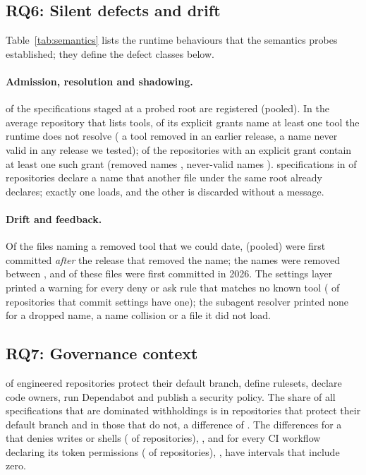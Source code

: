 \subsection{RQ6: Silent defects and drift}
\label{sec:res-rq6}

Table~\ref{tab:semantics} lists the runtime behaviours that the semantics probes established; they define the defect
classes below.



\paragraph{Admission, resolution and shadowing.}
\RQsixRegistered{} of the specifications staged at a probed root are registered (pooled). In the average repository
that lists tools, \RQsixUnresolved{} of its explicit grants name at least one tool the runtime does not resolve
(\RQsixLegacy{} a tool removed in an earlier release, \RQsixNeverValid{} a name never valid in any release we tested);
\RQsixUnresolvedRepos{} of the \nReposExplicit{} repositories with an explicit grant contain at least one such grant
(removed names \RQsixLegacyRepos{}, never-valid names \RQsixNeverValidRepos{}). \RQsixShadowed{} specifications in
\RQsixShadowedRepos{} of repositories declare a name that another file under the same root already declares; exactly
one loads, and the other is discarded without a message.

\paragraph{Drift and feedback.}
Of the \nDriftDated{} files naming a removed tool that we could date, \RQsixDriftAfter{} (pooled) were first committed
\emph{after} the release that removed the name; the names were removed between \DriftRemovalWindow{}, and
\RQsixDriftInSnapshotYear{} of these files were first committed in 2026. The settings layer printed a warning for every
deny or ask rule that matches no known tool (\RQsixVoidSettings{} of repositories that commit settings have one); the
subagent resolver printed none for a dropped name, a name collision or a file it did not load.

\subsection{RQ7: Governance context}
\label{sec:res-rq7}

\RQsevenBranchProtected{} of engineered repositories protect their default branch, \RQsevenRulesets{} define rulesets,
\RQsevenCodeowners{} declare code owners, \RQsevenDependabot{} run Dependabot and \RQsevenSecurityPolicy{} publish a
security policy. The share of all specifications that are dominated withholdings is \RQsevenIncoherentGoverned{} in
repositories that protect their default branch and \RQsevenIncoherentUngoverned{} in those that do not, a difference of
\RQsevenBPDiff{}. The differences for a  that denies writes or shells (\RQsevenSettingsDeny{} of
repositories), \RQsevenDiffSettingsDeny{}, and for every CI workflow declaring its token permissions
(\RQsevenCiAllScoped{} of repositories), \RQsevenDiffCiScoped{}, have intervals that include zero.
